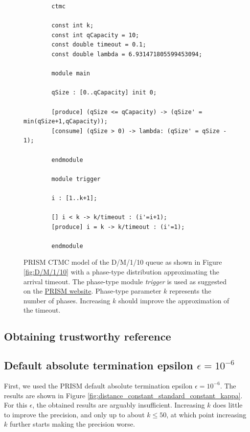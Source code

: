 \documentclass[paper=a4, fontsize=11pt]{scrartcl}
\numberwithin{equation}{section}		%
\numberwithin{figure}{section}			%
\numberwithin{table}{section}				%
\begin{document}
	\begin{figure}[H]
		\begin{lstlisting}
		ctmc
		
		const int k;
		const int qCapacity = 10;
		const double timeout = 0.1;
		const double lambda = 6.931471805599453094;
		
		module main
		
		qSize : [0..qCapacity] init 0;
		
		[produce] (qSize <= qCapacity) -> (qSize' = min(qSize+1,qCapacity));
		[consume] (qSize > 0) -> lambda: (qSize' = qSize - 1);
		
		endmodule
		
		module trigger
		
		i : [1..k+1];
		
		[] i < k -> k/timeout : (i'=i+1);
		[produce] i = k -> k/timeout : (i'=1);
		
		endmodule
		\end{lstlisting}
		\caption{PRISM CTMC model of the D/M/1/10 queue as shown in Figure \ref{fig:D/M/1/10} with a phase-type distribution approximating the arrival timeout. The phase-type module \emph{trigger} is used as suggested on the \href{http://www.prismmodelchecker.org/manual/FrequentlyAskedQuestions/PRISMModelling}{PRISM website}. Phase-type parameter $k$ represents the number of phases. Increasing $k$ should improve the approximation of the timeout. }
		\label{fig:D/M/1/10_PRISM}
	\end{figure}
	
	\subsection{Obtaining trustworthy reference}
	\label{S:2.1}
	
	
	
	\subsection{Default absolute termination epsilon $\epsilon = 10^{-6}$}
	\label{S:2.2}
	
	First, we used the PRISM default absolute termination epsilon $\epsilon = 10^{-6}$. The results are shown in Figure \ref{fig:distance_constant_standard_constant_kappa}. For this $\epsilon$, the obtained results are arguably insufficient. Increasing $k$ does little to improve the precision, and only up to about $k \leq 50$, at which point increasing $k$ further starts making the precision worse.
	
\end{document}
